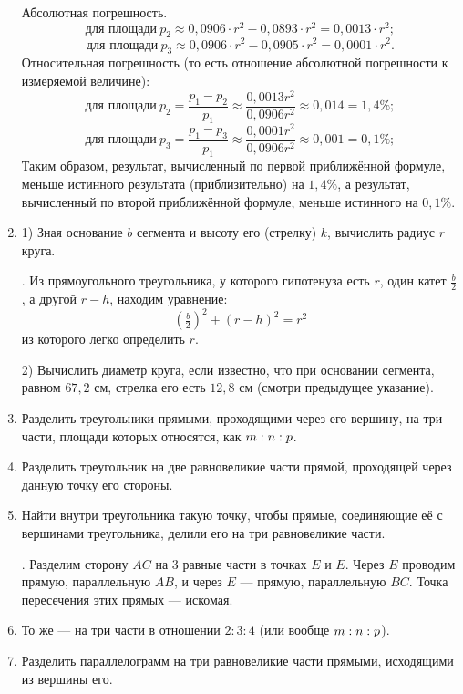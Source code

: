 \documentclass[twoside]{book}
\begin{document}
\begin{enumerate}[resume]
Абсолютная погрешность.
\[\text{для площади}~p_2 \approx 0{,}0906\cdot r^2 - 0{,}0893\cdot r^2 = 0{,}0013\cdot r^2;\]
\[\text{для площади}~p_3 \approx 0{,}0906\cdot r^2 - 0{,}0905\cdot r^2 = 0{,}0001\cdot r^2.\]
Относительная погрешность (то есть отношение абсолютной погрешности к измеряемой величине):
\[\text{для площади}~p_2 = \frac{p_1-p_2}{p_1}\approx\frac{0{,}0013r^2}{0{,}0906r^2}\approx0{,}014 = 1{,}4\%;\]
\[\text{для площади}~p_3 = \frac{p_1-p_3}{p_1}\approx\frac{0{,}0001r^2}{0{,}0906r^2}\approx0{,}001 = 0{,}1\%;\]
Таким образом, результат, вычисленный по первой приближённой формуле, меньше истинного результата (приблизительно) на $1{,}4\%$, а результат, вычисленный по второй приближённой формуле, меньше истинного на $0{,}1\%$.

 \item
1) Зная основание $b$ сегмента и высоту его (стрелку) $k$, вычислить радиус $r$ круга.

\smallskip
{}.
Из прямоугольного треугольника, у которого гипотенуза есть $r$, один катет $\frac b2$, а другой $r-h$, находим уравнение:
\[(\tfrac b2)^2+(r-h)^2=r^2\]
из которого легко определить $r$.

2) Вычислить диаметр круга, если известно, что при основании сегмента, равном $67{,}2$ см, стрелка его есть $12{,}8$ см (смотри предыдущее указание).

\smallskip
{}

 \item
Разделить треугольники прямыми, проходящими через его вершину, на три части, площади которых относятся, как $m\z:n:p$.

 \item
Разделить треугольник на две равновеликие части прямой, проходящей через данную точку его стороны.

 \item
Найти внутри треугольника такую точку, чтобы прямые, соединяющие её с вершинами треугольника, делили его на три равновеликие части.

\smallskip
{}.
Разделим сторону $AC$ на $3$ равные части в точках $E$ и $E$.
Через $E$ проводим прямую, параллельную $AB$, и через $E$ — прямую, параллельную $BC$.
Точка пересечения этих прямых — искомая.

 \item
То же — на три части в отношении $2:3:4$ (или вообще $m:n\z:p$).

 \item
Разделить параллелограмм на три равновеликие части прямыми, исходящими из вершины его.


\end{enumerate}
\end{document}
